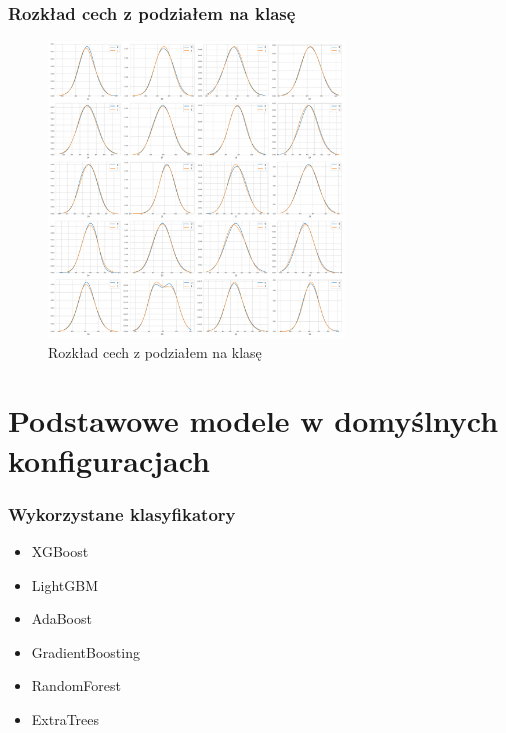 \documentclass{beamer}
\begin{document}
    \begin{frame}
        \frametitle{Rozkład cech z podziałem na klasę}
        \begin{figure}[!h]
            \centering
            \includegraphics[width=0.7\textwidth]{../images/feature-distribution-label.png}
            \caption{Rozkład cech z podziałem na klasę}
        \end{figure}
    \end{frame}

    \section{Podstawowe modele w domyślnych konfiguracjach}

    \begin{frame}
        \frametitle{Wykorzystane klasyfikatory}
        \begin{itemize}
            \item XGBoost
            \item LightGBM
            \item AdaBoost
            \item GradientBoosting
            \item RandomForest
            \item ExtraTrees
        \end{itemize}
    \end{frame}
\end{document}
